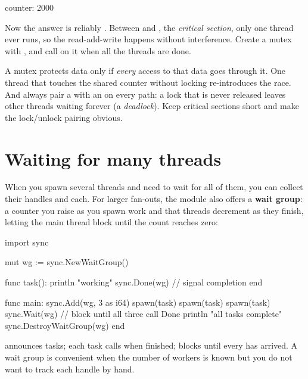 \begin{progout}
counter: 2000
\end{progout}

\begin{sloppypar}
Now the answer is reliably . Between  and
, the \emph{critical section}, only one thread ever
runs, so the read-add-write happens without interference. Create a mutex with
, and call  on it when all the threads are
done.
\end{sloppypar}

\begin{warn}
A mutex protects data only if \emph{every} access to that data goes through it.
One thread that touches the shared counter without locking re-introduces the race.
And always pair a  with an  on every path: a lock that is
never released leaves other threads waiting forever (a \emph{deadlock}). Keep
critical sections short and make the lock/unlock pairing obvious.
\end{warn}

\section{Waiting for many threads}

When you spawn several threads and need to wait for all of them, you can collect
their handles and  each. For larger fan-outs, the  module
also offers a \textbf{wait group}: a counter you raise as you spawn work and
that threads decrement as they finish, letting the main thread block until the
count reaches zero:

\begin{salamen}
import sync

mut wg := sync.NewWaitGroup()

func task():
    println "working"
    sync.Done(wg)         // signal completion
end

func main:
    sync.Add(wg, 3 as i64)
    spawn(task)
    spawn(task)
    spawn(task)
    sync.Wait(wg)         // block until all three call Done
    println "all tasks complete"
    sync.DestroyWaitGroup(wg)
end
\end{salamen}

 announces  tasks; each task calls 
when finished;  blocks until every  has arrived. A wait
group is convenient when the number of workers is known but you do not want to
track each handle by hand.

